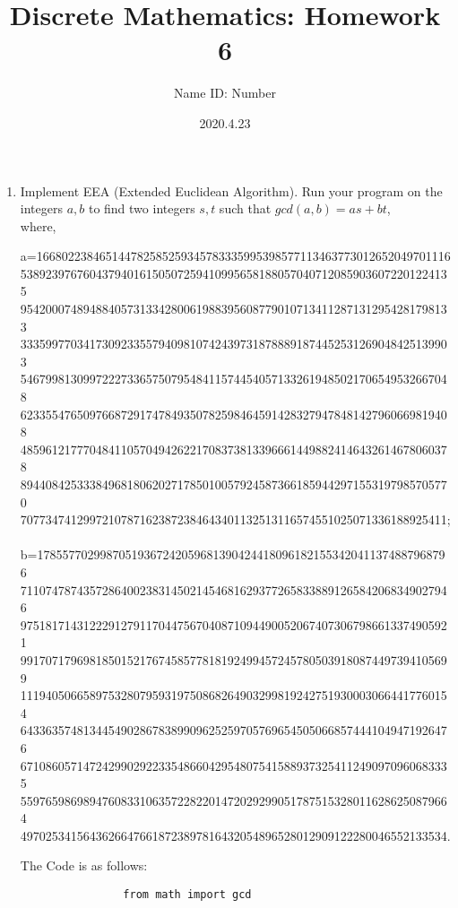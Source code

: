 \documentclass{article}
\title{Discrete Mathematics:  Homework 6}
\author{Name  \quad  \quad ID: Number}
\date{2020.4.23}
\theoremstyle{break}
\begin{document}
\maketitle
\begin{enumerate}
        
        \item Implement EEA (Extended Euclidean Algorithm).  
        Run your program on the integers $a, b$ to find two integers $s, t$ 
        such that $gcd(a, b) =as+bt$,\\
        where, \\
        \begin{center}
                a=166802238465144782585259345783335995398577113463773012652049701116\\
                538923976760437940161505072594109956581880570407120859036072201224135\\
                954200074894884057313342800619883956087790107134112871312954281798133\\
                333599770341730923355794098107424397318788891874452531269048425139903\\
                546799813099722273365750795484115744540571332619485021706549532667048\\
                623355476509766872917478493507825984645914283279478481427960669819408\\
                485961217770484110570494262217083738133966614498824146432614678060378\\
                894408425333849681806202717850100579245873661859442971553197985705770\\
                70773474129972107871623872384643401132513116574551025071336188925411;\\
                \leavevmode\\
                b=178557702998705193672420596813904244180961821553420411374887968796\\
                711074787435728640023831450214546816293772658338891265842068349027946\\
                975181714312229127911704475670408710944900520674073067986613374905921\\
                991707179698185015217674585778181924994572457805039180874497394105699\\
                111940506658975328079593197508682649032998192427519300030664417760154\\
                643363574813445490286783899096252597057696545050668574441049471926476\\
                671086057147242990292233548660429548075415889373254112490970960683335\\
                559765986989476083310635722822014720292990517875153280116286250879664\\
                49702534156436266476618723897816432054896528012909122280046552133534.\\
        \end{center}  
        \newpage
        The Code is as follows:\\
        \begin{lstlisting}
                from math import gcd


\end{lstlisting}
\end{enumerate}
\end{document}
